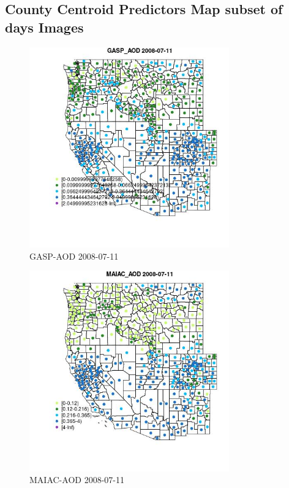 
\subsection{County Centroid Predictors Map subset of days Images} 
 

\begin{figure} 
\centering  
\includegraphics[width=0.77\textwidth]{Code_Outputs/df_report_ML_predictors_CountyCentroid_Locations_Dates_2008-01-01to2018-12-31_MapObsGASP_AOD2008-07-11.jpg} 
\caption{\label{fig:df_report_ML_predictors_CountyCentroid_Locations_Dates_2008-01-01to2018-12-31MapObsGASP_AOD2008-07-11}GASP-AOD 2008-07-11} 
\end{figure} 
 

\begin{figure} 
\centering  
\includegraphics[width=0.77\textwidth]{Code_Outputs/df_report_ML_predictors_CountyCentroid_Locations_Dates_2008-01-01to2018-12-31_MapObsMAIAC_AOD2008-07-11.jpg} 
\caption{\label{fig:df_report_ML_predictors_CountyCentroid_Locations_Dates_2008-01-01to2018-12-31MapObsMAIAC_AOD2008-07-11}MAIAC-AOD 2008-07-11} 
\end{figure} 
 

